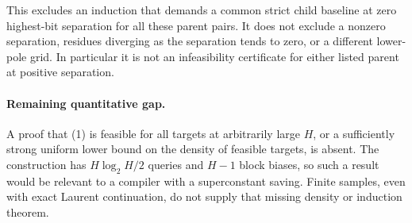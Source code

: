 \documentclass[11pt]{article}
\begin{document}
This excludes an induction that demands a common strict child baseline
at zero highest-bit separation for all these parent pairs. It does not
exclude a nonzero separation, residues diverging as the separation tends
to zero, or a different lower-pole grid. In particular it is not an
infeasibility certificate for either listed parent at positive separation.

\paragraph{Remaining quantitative gap.}
A proof that (1) is feasible for all targets at arbitrarily large $H$,
or a sufficiently strong uniform lower bound on the density of feasible
targets, is absent. The construction has $H\log_2 H/2$ queries and
$H-1$ block biases, so such a result would be relevant to a compiler
with a superconstant saving. Finite samples, even with exact Laurent
continuation, do not supply that missing density or induction theorem.
\end{document}
